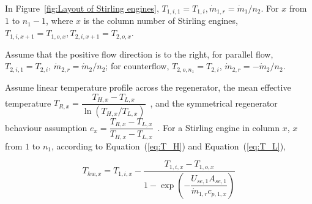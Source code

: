 
In Figure~\ref{fig:Layout of Stirling engines}, $T_{1,i,1}=T_{1,i},\dot{m}_{1,r}=\dot{m}_{1}/n_{2}$. For $x$ from $1$ to $n_1-1$, where $x$ is the column number of Stirling engines, $T_{1,i,x+1}=T_{1,o,x},T_{2,i,x+1}=T_{2,o,x}$.

Assume that the positive flow direction is to the right, for parallel flow, $T_{2,i,1}=T_{2,i}$, $\dot{m}_{2,r}=\dot{m}_{2}/n_{2}$; for counterflow, $T_{2,o,n_1}=T_{2,i}$, $\dot{m}_{2,r}=-\dot{m}_{2}/n_{2}$.


%

Assume linear temperature profile across the regenerator, the mean effective temperature $T_{R,x}=\dfrac{T_{H,x}-T_{L,x}}{\ln(T_{H,x}/T_{L,x})}$~\cite{Der2007,Cavazzuti2012}, and the symmetrical regenerator behaviour assumption $e_{x}=\dfrac{T_{R,x}-T_{L,x}}{T_{H,x}-T_{L,x}}$~\cite{Formosa2010,Juhasz2010}. For a Stirling engine in column $x$, $x$ from $1$ to $n_1$, according to Equation~(\ref{eq:T_H}) and Equation~(\ref{eq:T_L}),

\begin{equation}
	T_{hw,x}=T_{1,i,x}-\dfrac{T_{1,i,x}-T_{1,o,x}}{1-\exp(-\dfrac{U_{se,1}A_{se,1}}{\dot{m}_{1,r}c_{p,1,x}})}\label{eq:T_H_x}
\end{equation}


